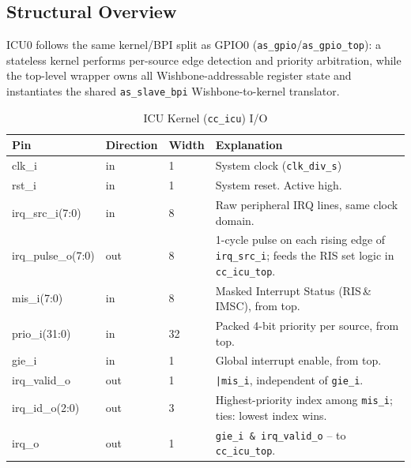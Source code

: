 \subsection{Structural Overview}

ICU0 follows the same kernel/BPI split as GPIO0
(\texttt{as\_gpio}/\texttt{as\_gpio\_top}): a stateless kernel performs
per-source edge detection and priority arbitration, while the top-level
wrapper owns all Wishbone-addressable register state and instantiates the
shared \texttt{as\_slave\_bpi} Wishbone-to-kernel translator.

\begin{table}[H]
\caption{ICU Kernel (\texttt{cc\_icu}) I/O}
\label{tab:asIcuPer04a}
\centering
\begin{tabularx}{\textwidth}{|l |l |l |X|}
  \hline
  Pin & Direction & Width & Explanation \\
  \hline
  \hline
  clk\_i & in & 1 & System clock (\texttt{clk\_div\_s}) \\
  \hline
  rst\_i & in & 1 & System reset. Active high. \\
  \hline
  irq\_src\_i(7:0) & in & 8 & Raw peripheral IRQ lines, same clock domain. \\
  \hline
  irq\_pulse\_o(7:0) & out & 8 & 1-cycle pulse on each rising edge of
    \texttt{irq\_src\_i}; feeds the RIS set logic in \texttt{cc\_icu\_top}. \\
  \hline
  mis\_i(7:0) & in & 8 & Masked Interrupt Status (RIS\,\&\,IMSC), from top. \\
  \hline
  prio\_i(31:0) & in & 32 & Packed 4-bit priority per source, from top. \\
  \hline
  gie\_i & in & 1 & Global interrupt enable, from top. \\
  \hline
  irq\_valid\_o & out & 1 & \texttt{|mis\_i}, independent of \texttt{gie\_i}. \\
  \hline
  irq\_id\_o(2:0) & out & 3 & Highest-priority index among \texttt{mis\_i};
    ties: lowest index wins. \\
  \hline
  irq\_o & out & 1 & \texttt{gie\_i \& irq\_valid\_o} -- to \texttt{cc\_icu\_top}. \\
  \hline
\end{tabularx}
\end{table}

